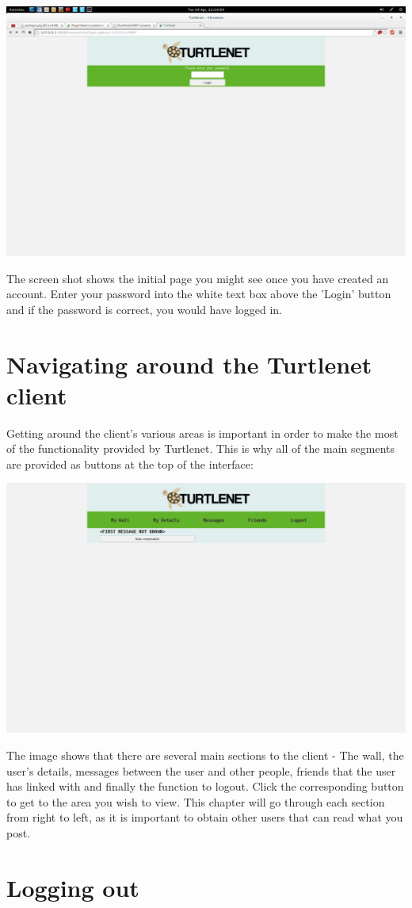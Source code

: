 \includegraphics[scale=0.2]{../Screenshots/Screenshot from 2014-04-29 22-24-59}

The screen shot shows the initial page you might see once you have created an
account.  Enter your password into the white text box above the 'Login' button
and if the password is correct, you would have logged in.

\section{Navigating around the Turtlenet client}
Getting around the client's various areas is important in order to make the most
of the functionality provided by Turtlenet.  This is why all of the main
segments are provided as buttons at the top of the interface:

\includegraphics[scale=0.2]{../Screenshots/Screenshot from 2014-04-29 22-31-38}

The image shows that there are several main sections to the client - The wall,
the user's details, messages between the user and other people, friends that the
user has linked with and finally the function to logout.  Click the
corresponding button to get to the area you wish to view.  This chapter will go
through each section from right to left, as it is important to obtain other
users that can read what you post.

\section{Logging out}
